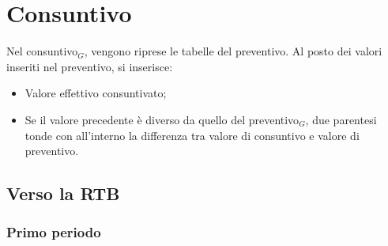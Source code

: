 \chapter{Consuntivo}
\renewcommand\arraystretch{1,2}

Nel consuntivo$_G$, vengono riprese le tabelle del preventivo. Al posto dei valori inseriti nel preventivo, si inserisce:
\begin{itemize}
    \item Valore effettivo consuntivato;
    \item Se il valore precedente è diverso da quello del preventivo$_G$, due parentesi tonde con all'interno
        la differenza tra valore di consuntivo e valore di preventivo.
\end{itemize}

\section{Verso la RTB}

\subsection{Primo periodo}


